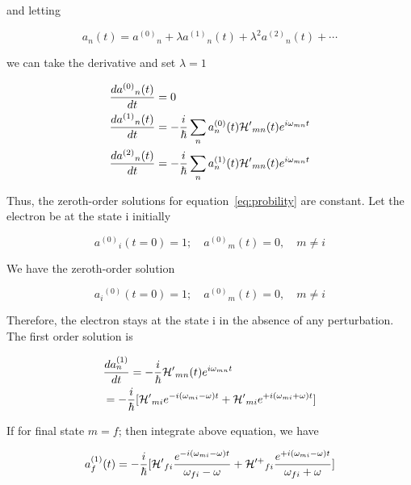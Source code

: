 and letting

\begin{equation}
  a_n(t)={a^{(0)}}_n+\lambda{a^{(1)}}_n(t)+\lambda^2{a^{(2)}}_n(t)+\cdots
\end{equation}

we can take the derivative and set $\lambda=1$


\begin{eqnarray}
\begin{aligned}
  & \frac{d{{a^{(0)}}_n(t)}}{dt}=0 \\
  & \frac{d{{a^{(1)}}_n(t)}}{dt}=-\frac{i}{\hbar}\sum_{n}{a^{(0)}_n(t)}{\HAM^\prime}_{mn}(t)e^{i\omega_{mn}t}
\\
  & \frac{d{{a^{(2)}}_n(t)}}{dt}=- \frac{i}{\hbar}\sum_{n}{a^{(1)}_n(t)}{\HAM^\prime}_{mn}(t)e^{i\omega_{mn}t}
\\
\label{eq:probility}
\end{aligned}
\end{eqnarray}

Thus, the zeroth-order solutions for equation~\ref{eq:probility} are constant. Let the electron be at the state i initially

\begin{equation}
  {a^{(0)}}_i(t=0)=1; \quad {a^{(0)}}_m(t)=0, \quad m\neq {i}
\end{equation}

We have the zeroth-order solution

\begin{equation}
  {{a_i}^{(0)}}(t=0)=1; \quad {a^{(0)}}_m(t)=0, \quad m\neq {i}
\end{equation}

Therefore, the electron stays at the state i in the absence of any perturbation. The first order solution is

\begin{eqnarray}
\begin{aligned}
  & \frac{d{a^{(1)}_n}}{dt}=-\frac{i}{\hbar}{\mathcal{H}^\prime}_{mn}(t)e^{i\omega_{mn}t} \\
  & = -\frac{i}{\hbar}[{\mathcal{H}^\prime}_{mi}e^{-i(\omega_{mi}-\omega)t}+{\mathcal{H}^\prime}_{mi}e^{+i(\omega_{mi}+\omega)t}]
\end{aligned}
\end{eqnarray}

If for final state $m=f$; then integrate above equation, we have

\begin{equation}
{a^{(1)}_{f}(t)}=-\frac{i}{\hbar}[{\mathcal{H}^\prime}_{fi}\frac{e^{-i(\omega_{mi}-\omega)t}}{\omega_{fi}-\omega}+{\mathcal{H}^{\prime+}}_{fi}\frac{e^{+i(\omega_{mi}-\omega)t}}{\omega_{fi}+\omega}]
\end{equation}

